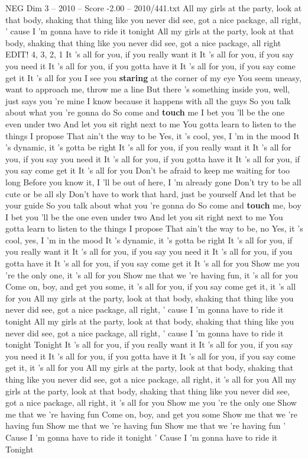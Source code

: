 \begin{textsample}{NEG Dim 3 – 2010 – Score -2.00 – 2010/441.txt}  \label{ex:f3_neg_029}
All my girls at the party, look at that body, shaking that thing like you never did see, got a nice package, all right, ' cause I 'm gonna have to ride it tonight All my girls at the party, look at that body, shaking that thing like you never did see, got a nice package, all right EDIT! 4, 3, 2, 1 It 's all for you, if you really want it It 's all for you, if you say you need it It 's all for you, if you gotta have it It 's all for you, if you say come get it It 's all for you I see you \textbf{staring} at the corner of my eye You seem uneasy, want to approach me, throw me a line But there 's something inside you, well, just says you 're mine I know because it happens with all the guys So you talk about what you 're gonna do So come and \textbf{touch} me I bet you 'll be the one even under two And let you sit right next to me You gotta learn to listen to the things I propose That ain't the way to be Yes, it 's cool, yes, I 'm in the mood It 's dynamic, it 's gotta be right It 's all for you, if you really want it It 's all for you, if you say you need it It 's all for you, if you gotta have it It 's all for you, if you say come get it It 's all for you Don't be afraid to keep me waiting for too long Before you know it, I 'll be out of here, I 'm already gone Don't try to be all cute or be all sly Don't have to work that hard, just be yourself And let that be your guide So you talk about what you 're gonna do So come and \textbf{touch} me, boy I bet you 'll be the one even under two And let you sit right next to me You gotta learn to listen to the things I propose That ain't the way to be, no Yes, it 's cool, yes, I 'm in the mood It 's dynamic, it 's gotta be right It 's all for you, if you really want it It 's all for you, if you say you need it It 's all for you, if you gotta have it It 's all for you, if you say come get it It 's all for you Show me you 're the only one, it 's all for you Show me that we 're having fun, it 's all for you Come on, boy, and get you some, it 's all for you, if you say come get it, it 's all for you All my girls at the party, look at that body, shaking that thing like you never did see, got a nice package, all right, ' cause I 'm gonna have to ride it tonight All my girls at the party, look at that body, shaking that thing like you never did see, got a nice package, all right, ' cause I 'm gonna have to ride it tonight Tonight It 's all for you, if you really want it It 's all for you, if you say you need it It 's all for you, if you gotta have it It 's all for you, if you say come get it, it 's all for you All my girls at the party, look at that body, shaking that thing like you never did see, got a nice package, all right, it 's all for you All my girls at the party, look at that body, shaking that thing like you never did see, got a nice package, all right, it 's all for you Show me you 're the only one Show me that we 're having fun Come on, boy, and get you some Show me that we 're having fun Show me that we 're having fun Show me that we 're having fun ' Cause I 'm gonna have to ride it tonight ' Cause I 'm gonna have to ride it Tonight

\end{textsample}
